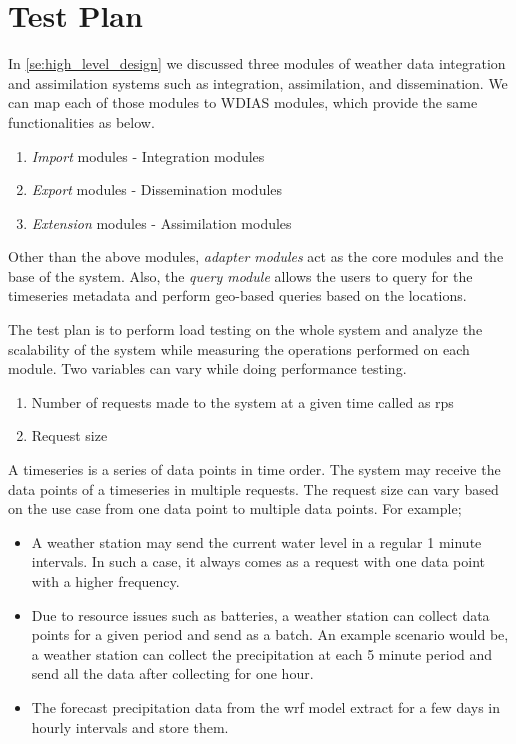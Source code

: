 \section{Test Plan}
\label{se:test_plan}

In \cref{se:high_level_design} we discussed three modules of weather data integration and assimilation systems such as integration, assimilation, and dissemination. We can map each of those modules to WDIAS modules, which provide the same functionalities as below.
\begin{enumerate}
    \item \emph{Import} modules - Integration modules
    \item \emph{Export} modules - Dissemination modules
    \item \emph{Extension} modules - Assimilation modules
\end{enumerate}

Other than the above modules, \emph{adapter modules} act as the core modules and the base of the system. Also, the \emph{query module} allows the users to query for the timeseries metadata and perform geo-based queries based on the locations.

The test plan is to perform load testing on the whole system and analyze the scalability of the system while measuring the operations performed on each module. Two variables can vary while doing performance testing.
\begin{enumerate}
    \item Number of requests made to the system at a given time called as \acrfull{rps}
    \item Request size
\end{enumerate}

A timeseries is a series of data points in time order. The system may receive the data points of a timeseries in multiple requests. The request size can vary based on the use case from one data point to multiple data points. For example;
\begin{itemize}
    \item A weather station may send the current water level in a regular 1 minute intervals. In such a case, it always comes as a request with one data point with a higher frequency.
    \item Due to resource issues such as batteries, a weather station can collect data points for a given period and send as a batch. An example scenario would be, a weather station can collect the precipitation at each 5 minute period and send all the data after collecting for one hour.
    \item The forecast precipitation data from the \acrshort{wrf} model extract for a few days in hourly intervals and store them.
\end{itemize}

